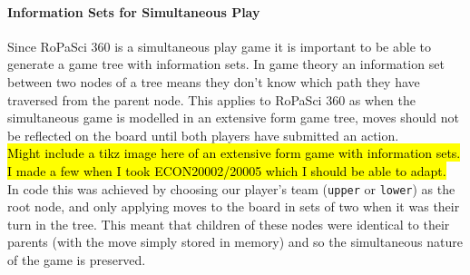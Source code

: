 \documentclass{article}
\begin{document}
\paragraph{Information Sets for Simultaneous Play}
Since RoPaSci 360 is a simultaneous play game it is important to be able to generate a game tree with information sets. In game theory an information set between two nodes of a tree means they don't know which path they have traversed from the parent node. This applies to RoPaSci 360 as when the simultaneous game is modelled in an extensive form game tree, moves should not be reflected on the board until both players have submitted an action.\\[2mm]
\hl{Might include a tikz image here of an extensive form game with information sets. I made a few when I took ECON20002/20005 which I should be able to adapt.}\\[2mm]
In code this was achieved by choosing our player's team (\verb|upper| or \verb|lower|) as the root node, and only applying moves to the board in sets of two when it was their turn in the tree. This meant that children of these nodes were identical to their parents (with the move simply stored in memory) and so the simultaneous nature of the game is preserved.
\end{document}
